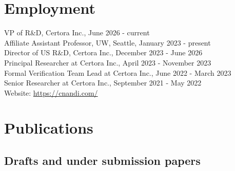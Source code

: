 \documentclass[margin, 10pt]{res} %
\begin{document}
\begin{resume}


\section{Employment}

VP of R\&D, Certora Inc., June 2026 - current \\
Affiliate Assistant Professor, UW, Seattle, January 2023 - present \\

Director of US R\&D, Certora Inc., December 2023 - June 2026 \\
Principal Researcher at Certora Inc., April 2023 - November 2023 \\
Formal Verification Team Lead at Certora Inc., June 2022 - March 2023 \\
Senior Researcher at Certora Inc., September 2021 - May 2022 \\
Website: \url{https://cnandi.com/} \\

\section{Publications}
\subsection{Drafts and under submission papers}
\begin{enumerate}


\end{enumerate}
\end{resume}
\end{document}
